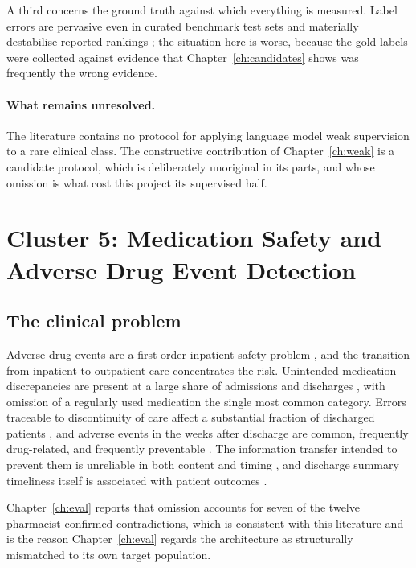 A third concerns the ground truth against which everything is measured. Label
errors are pervasive even in curated benchmark test sets and materially
destabilise reported rankings \citep{northcutt2021labelerrors}; the situation
here is worse, because the gold labels were collected against evidence that
Chapter~\ref{ch:candidates} shows was frequently the wrong evidence.

\paragraph{What remains unresolved.} The literature contains no protocol for
applying language model weak supervision to a rare clinical class. The
constructive contribution of Chapter~\ref{ch:weak} is a candidate protocol,
which is deliberately unoriginal in its parts, and whose omission is what cost
this project its supervised half.

\section{Cluster 5: Medication Safety and Adverse Drug Event Detection}
\label{sec:bg-safety}

\subsection{The clinical problem}

Adverse drug events are a first-order inpatient safety problem
\citep{bates1995ade}, and the transition from inpatient to outpatient care
concentrates the risk. Unintended medication discrepancies are present at a
large share of admissions \citep{cornish2005discrepancies} and discharges
\citep{wong2008reconciliation}, with omission of a regularly used medication the
single most common category. Errors traceable to discontinuity of care affect a
substantial fraction of discharged patients \citep{moore2003discontinuity}, and
adverse events in the weeks after discharge are common, frequently drug-related,
and frequently preventable \citep{forster2003adverse}. The information transfer
intended to prevent them is unreliable in both content and timing
\citep{kripalani2007deficits}, and discharge summary timeliness itself is
associated with patient outcomes \citep{li2013timeliness}.

Chapter~\ref{ch:eval} reports that omission accounts for seven of the twelve
pharmacist-confirmed contradictions, which is consistent with this literature and
is the reason Chapter~\ref{ch:eval} regards the architecture as structurally
mismatched to its own target population.

